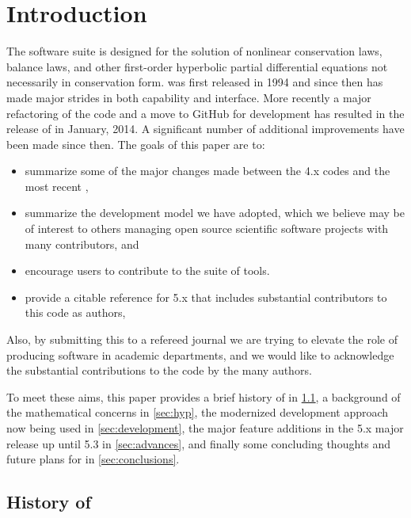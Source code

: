 %
%
%

\section{Introduction}\label{sec:intro}

The \clawpack software suite \cite{clawpack} is designed for the solution of
nonlinear conservation laws, balance laws, and other first-order hyperbolic
partial differential equations not necessarily in conservation form.  \clawpack
was first released in 1994 and since then has made major strides in both
capability and interface. More recently a major refactoring of the code and a
move to GitHub for development has resulted in the release of
 in January, 2014. A significant number of additional improvements
have been made since then. The goals of this paper are to:
\begin{itemize}
\item summarize some of the major changes made between the \clawpack
4.x codes and the most recent ,
\item summarize the development model we have adopted, which we believe
may be of interest to others managing open source scientific software
projects with many contributors, and
\item encourage users to contribute to the \clawpack suite of tools.
\item provide a citable reference for \clawpack 5.x that includes
substantial contributors to this code as authors,
\end{itemize}
Also, by submitting this to a refereed journal we are trying to elevate
the role of producing software in academic departments, and we
would like to acknowledge the substantial contributions to the
code by the many authors.

To meet these aims, this paper provides a brief history of \clawpack in 
\cref{sub:history}, a background of the mathematical concerns in \cref{sec:hyp},
the modernized development approach now being used in \cref{sec:development},
the major feature additions in the \clawpack 5.x major release up until 5.3 in
\cref{sec:advances}, and finally some concluding thoughts and future plans for
\clawpack in
\cref{sec:conclusions}.

\subsection{History of \clawpack} \label{sub:history}

